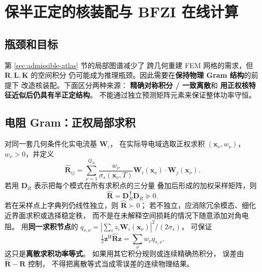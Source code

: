\section{保半正定的核装配与 BFZI 在线计算}\label{sec:positive-assembly}
\subsection{瓶颈和目标}
第 \ref{sec:admissible-atlas} 节的局部图谱减少了
跨几何重建 FEM 网格的需求，但 \(\bm R,\bm L,\bm K\) 的空间积分
仍可能成为推理瓶颈。因此需要在\textbf{保持物理 Gram 结构}的前提下
改造核装配。下面区分两种来源：
\textbf{精确对称积分 / 一致离散}和
\textbf{用正权核特征近似后仍具有半正定结构}。
不能通过独立预测矩阵元素来保证整体功率守恒。

\subsection{电阻 Gram：正权局部求积}
对同一套几何条件化实电流基 \(\bm W_i\)，
在实际导电域选取正权求积
\((\bm x_\nu,w_\nu)\)，\(w_\nu>0\)，并定义
\begin{equation}
\widehat{\bm R}_{ij}
=\sum_{\nu=1}^{Q_R}
\frac{w_\nu}{\sigma_s(\bm x_\nu,T)}
\bm W_i(\bm x_\nu)\cdot\bm W_j(\bm x_\nu).
\label{eq:R-positive}
\end{equation}
若用 \(\bm D_R\) 表示把每个模式在所有求积点的三分量
叠加后形成的加权采样矩阵，则
\[
\widehat{\bm R}=\bm D_R^{\mathsf T}\bm D_R\succeq0.
\]
若在采样点上字典列仍线性独立，则 \(\widehat{\bm R}\succ0\)；
若不独立，应消除冗余模态、细化近界面求积或选择稳定秩，
而不是在未解释空间损耗的情况下随意添加对角电阻。
用\textbf{同一求积节点}的
\(q_{s,\nu}=|\sum_i z_i\bm W_i(\bm x_\nu)|^2/(2\sigma_s)\)，
可保证
\[
\tfrac12\bm z^{\mathrm H}\widehat{\bm R}\bm z
=\sum_\nu w_\nu q_{s,\nu}.
\]
这只是\textbf{离散求积功率等式}。
如果用其它积分规则或连续精确热积分，
误差由 \(\widehat{\bm R}-\bm R\) 控制，
不得把离散等式当成零误差的连续物理结果。

